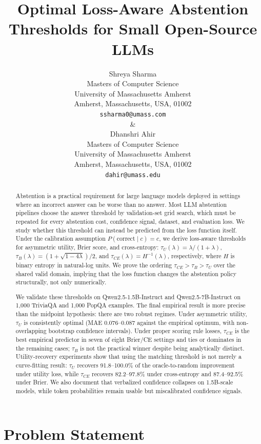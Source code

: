 \documentclass[letterpaper,10pt,twocolumn]{article}
\title{\LARGE \bf
Optimal Loss-Aware Abstention Thresholds for Small Open-Source LLMs
}
\author{
\begin{tabular}{cc}
\parbox{3in}{\centering Shreya Sharma \\
Masters of Computer Science \\
University of Massachusetts Amherst \\
Amherst, Massachusetts, USA, 01002 \\
{\tt\small ssharma0@umass.com}}
&
\parbox{3in}{\centering Dhanshri Ahir \\
Masters of Computer Science \\
University of Massachusetts Amherst \\
Amherst, Massachusetts, USA, 01002 \\
{\tt\small dahir@umass.edu}}
\end{tabular}
}
\begin{document}
\maketitle
\thispagestyle{plain}
\pagestyle{plain}

\begin{abstract}
Abstention is a practical requirement for large language models deployed in
settings where an incorrect answer can be worse than no answer. Most LLM
abstention pipelines choose the answer threshold by validation-set grid search,
which must be repeated for every abstention cost, confidence signal, dataset,
and evaluation loss. We study whether this threshold can instead be predicted
from the loss function itself. Under the calibration assumption
$P(\mathrm{correct}\mid c)=c$, we derive loss-aware thresholds for asymmetric
utility, Brier score, and cross-entropy:
$\tau_U(\lambda)=\lambda/(1+\lambda)$,
$\tau_B(\lambda)=(1+\sqrt{1-4\lambda})/2$, and
$\tau_{CE}(\lambda)=H^{-1}(\lambda)$, respectively, where $H$ is binary
entropy in natural-log units. We prove the ordering
$\tau_{CE}>\tau_B>\tau_U$ over the shared valid domain, implying that the
loss function changes the abstention policy structurally, not only
numerically.

We validate these thresholds on Qwen2.5-1.5B-Instruct and
Qwen2.5-7B-Instruct on 1,000 TriviaQA and 1,000 PopQA examples. The final
empirical result is more precise than the midpoint hypothesis: there are two
robust regimes. Under asymmetric utility, $\tau_U$ is consistently optimal
(MAE 0.076--0.087 against the empirical optimum, with non-overlapping
bootstrap confidence intervals). Under proper scoring rule losses, $\tau_{CE}$
is the best empirical predictor in seven of eight Brier/CE settings and ties
or dominates in the remaining cases; $\tau_B$ is not the practical winner
despite being analytically distinct. Utility-recovery experiments show that
using the matching threshold is not merely a curve-fitting result:
$\tau_U$ recovers 91.8--100.0\% of the oracle-to-random improvement under
utility loss, while $\tau_{CE}$ recovers 82.2--97.8\% under cross-entropy and
87.4--92.5\% under Brier. We also document that verbalized confidence
collapses on 1.5B-scale models, while token probabilities remain usable but
miscalibrated confidence signals.
\end{abstract}

\section{Problem Statement}
\end{document}
